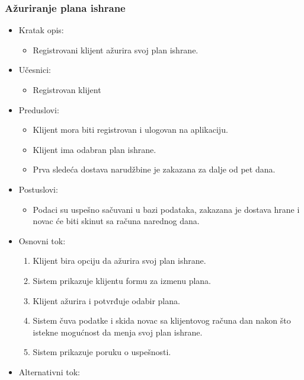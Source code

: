 \subsubsection{Ažuriranje plana ishrane}

\begin{itemize}
    \item Kratak opis:
        \begin{itemize}
            \item Registrovani klijent ažurira svoj plan ishrane.
        \end{itemize}
    \item Učesnici:
        \begin{itemize}
            \item Registrovan klijent
        \end{itemize}
    \item Preduslovi:
        \begin{itemize}
            \item Klijent mora biti registrovan i ulogovan na aplikaciju.
            \item Klijent ima odabran plan ishrane.
            \item Prva sledeća dostava narudžbine je zakazana za dalje od pet dana.
        \end{itemize}
    \item Postuslovi:
        \begin{itemize}
            \item Podaci su uspešno sačuvani u bazi podataka, zakazana je dostava hrane i novac će biti skinut sa računa narednog dana.
        \end{itemize}
    \item Osnovni tok:
        \begin{enumerate}
            \item Klijent bira opciju da ažurira svoj plan ishrane.
            \item Sistem prikazuje klijentu formu za izmenu plana.
            \item Klijent ažurira i potvrđuje odabir plana.
            \item Sistem čuva podatke i skida novac sa klijentovog računa dan nakon što istekne mogućnost da menja svoj plan ishrane.
            \item Sistem prikazuje poruku o uspešnosti. 
        \end{enumerate}
    \item Alternativni tok:
        \begin{itemize}

\end{itemize}
\end{itemize}
